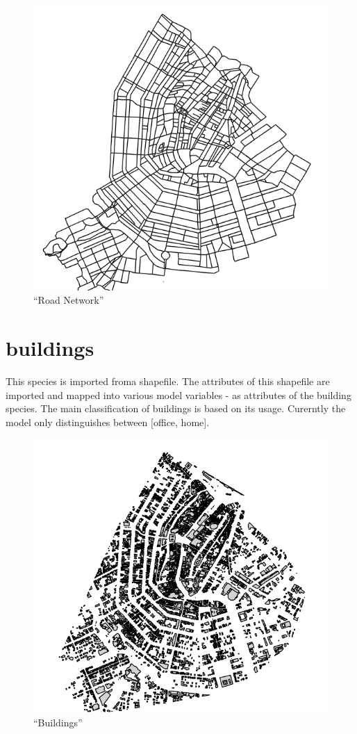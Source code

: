 \documentclass[]{book}
\theoremstyle{definition}
\theoremstyle{definition}
\theoremstyle{definition}
\theoremstyle{remark}
\begin{document}
\begin{figure}
\centering
\includegraphics{images/network.png}
\caption{``Road Network''}
\end{figure}

\hypertarget{buildings}{%
\section{buildings}\label{buildings}}

This species is imported froma shapefile. The attributes of this
shapefile are imported and mapped into various model variables - as
attributes of the building species. The main classification of buildings
is based on its usage. Curerntly the model only distinguishes between
{[}office, home{]}.

\begin{figure}
\centering
\includegraphics{images/buildings.png}
\caption{``Buildings''}
\end{figure}
\end{document}
